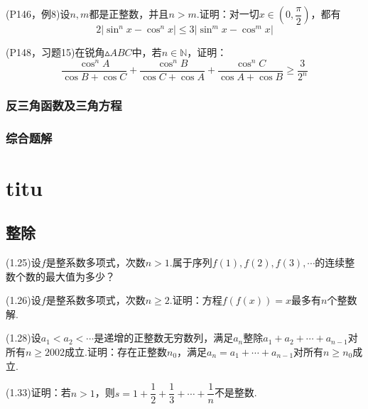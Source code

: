 \documentclass[cn,hazy,black,10pt,normal]{elegantnote}
\newcommand{\ssb}[1]{\left( #1 \right)}
\begin{document}
\newpage
\begin{problem}
	(P146，例8)设$n,m$都是正整数，并且$n>m$.证明：对一切$x \in \ssb{ 0,\dfrac{\pi}{2} }$，都有$$2|\sin ^n x - \cos ^n x| \leq 3|\sin ^m x - \cos ^m x|$$
\end{problem}

\newpage
\begin{problem}
	(P148，习题15)在锐角$\vartriangle ABC$中，若$n \in \mathbb{N}$，证明：$$\frac{\cos ^n A}{\cos B + \cos C} + \frac{\cos ^n B}{\cos C + \cos A} + \frac{\cos ^n C}{\cos A + \cos B} \geq \frac{3}{2^n}$$
\end{problem}

\newpage
\section{反三角函数及三角方程}
\section{综合题解}

\setcounter{chapter}{0}
\part{titu}

\chapter{整除}

\begin{problem}
	(1.25)设$f$是整系数多项式，次数$n>1$.属于序列$f(1),f(2),f(3),\cdots $的连续整数个数的最大值为多少？
\end{problem}

\vspace{20em}

\begin{problem}
	(1.26)设$f$是整系数多项式，次数$n \geq 2$.证明：方程$f(f(x))=x$最多有$n$个整数解.
\end{problem}

\newpage
\begin{problem}
	(1.28)设$a_1 < a_2 < \cdots $是递增的正整数无穷数列，满足$a_n$整除$a_1+a_2+\cdots + a_{n-1}$对所有$n \geq 2002$成立.证明：存在正整数$n_0$，满足$a_n=a_1+\cdots +a_{n-1}$对所有$n \geq n_0$成立.
\end{problem}

\vspace{26em}

\begin{problem}
	(1.33)证明：若$n>1$，则$s=1+\dfrac{1}{2}+\dfrac{1}{3}+\cdots +\dfrac{1}{n}$不是整数.
\end{problem}
\end{document}
